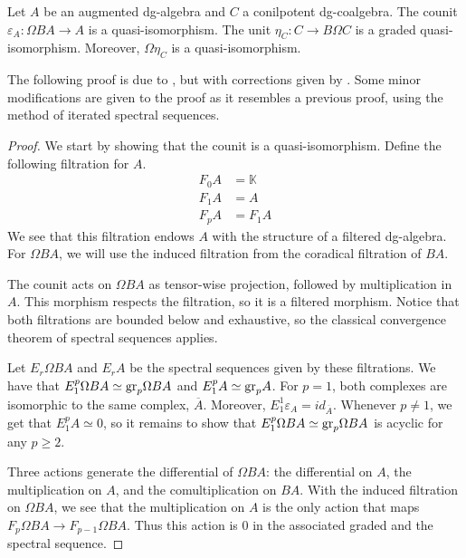 \documentclass[../thesis.tex]{subfiles}
\begin{document}
            \begin{proposition}\label{prop: unit-counit-qif}
                Let $A$ be an augmented dg-algebra and $C$ a conilpotent dg-coalgebra. The counit $\varepsilon_A: \Omega BA \rightarrow A$ is a quasi-isomorphism. The unit $\eta_C: C \rightarrow B\Omega C$ is a graded quasi-isomorphism. Moreover, $\Omega \eta_C$ is a quasi-isomorphism.
            \end{proposition}

            The following proof is due to \cite{LefevreHasegawa03}, but with corrections given by \cite{Keller05}. Some minor modifications are given to the proof as it resembles a previous proof, using the method of iterated spectral sequences.

            \begin{proof}
               We start by showing that the counit is a quasi-isomorphism. Define the following filtration for $A$.
                \begin{align*}
                    F_0A & = \mathbb{K} \\
                    F_1A & = A \\
                    F_pA & = F_1A 
                \end{align*}
                We see that this filtration endows $A$ with the structure of a filtered dg-algebra. For $\Omega BA$, we will use the induced filtration from the coradical filtration of $BA$.

                The counit acts on $\Omega BA$ as tensor-wise projection, followed by multiplication in $A$. This morphism respects the filtration, so it is a filtered morphism. Notice that both filtrations are bounded below and exhaustive, so the classical convergence theorem of spectral sequences applies.

                Let $E_r\Omega BA$ and $E_rA$ be the spectral sequences given by these filtrations. We have that $E_1^{p}\Omega BA \simeq \tt{gr}_p \Omega BA$ and $E_1^{p}A \simeq \tt{gr}_pA$. For $p=1$, both complexes are isomorphic to the same complex, $\overline{A}$. Moreover, $E_1^{1}\varepsilon_A = id_{\overline{A}}$. Whenever $p\neq 1$, we get that $E_1^p A \simeq 0$, so it remains to show that $E_1^p \Omega BA \simeq \tt{gr}_p \Omega BA$ is acyclic for any $p \geq 2$.

                Three actions generate the differential of $\Omega BA$: the differential on $A$, the multiplication on $A$, and the comultiplication on $BA$. With the induced filtration on $\Omega BA$, we see that the multiplication on $A$ is the only action that maps $F_p\Omega BA \rightarrow F_{p-1}\Omega BA$. Thus this action is $0$ in the associated graded and the spectral sequence. 


\end{proof}
\end{document}

